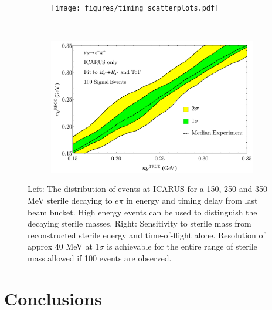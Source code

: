 \documentclass[11pt, a4paper]{article}
\begin{document}
\begin{figure}[t]
\center
\begin{subfigure}[t]{0.5\textwidth}
\texttt{[image: figures/timing\_scatterplots.pdf]}
\end{subfigure}%
~
\begin{subfigure}[t]{0.475\textwidth}
\includegraphics[width=\textwidth]{figures/brazil_timing.pdf}
\end{subfigure}

\caption{\label{fig:tof_scatter}Left: The distribution of events at ICARUS for a
150, 250 and 350 MeV sterile decaying to $e \pi$ in energy and timing delay
from last beam bucket. High energy events can be used to distinguish the
decaying sterile masses. Right: Sensitivity to sterile mass from reconstructed sterile energy and time-of-flight alone. Resolution of approx 40 MeV at 1$\sigma$ is achievable for the entire range of sterile mass allowed if 100 events are observed.  }

\end{figure}



\section{Conclusions}
\end{document}
